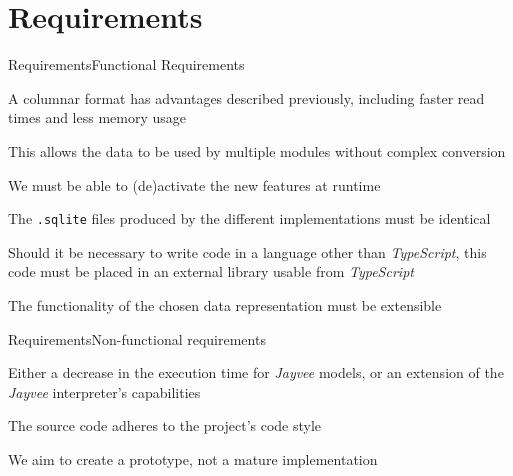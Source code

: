 \section{Requirements}
\begin{frame}[t]{Requirements}{Functional Requirements}
	\begin{description}[<+(1)->]
		\item[columnar] A columnar format has advantages described previously, including faster read times and less memory usage
		\item[interoperability] This allows the data to be used by multiple modules without complex conversion
		\item[feature toggle] We must be able to (de)activate the new features at runtime
		\item[compatibility] The \Verb|.sqlite| files produced by the different implementations must be identical
		\item[modularization] Should it be necessary to write code in a language other than \emph{TypeScript}, this code must be placed in an external library usable from \emph{TypeScript}
		\item[extensibility] The functionality of the chosen data representation must be extensible
	\end{description}
\end{frame}
\begin{frame}[t]{Requirements}{Non-functional requirements}
	\begin{description}[<+(1)->]
		\item[performance] Either a decrease in the execution time for \emph{Jayvee} models, or an extension of the \emph{Jayvee} interpreter's capabilities
		\item[code style] The source code adheres to the project's code style
		\item[maturity] We aim to create a prototype, not a mature implementation
	\end{description}
\end{frame}

